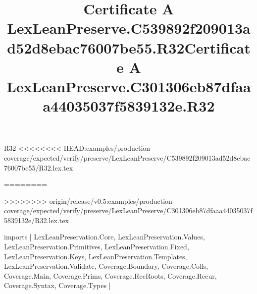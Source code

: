 \begin{lexlean}{R32}
<<<<<<<< HEAD:examples/production-coverage/expected/verify/preserve/LexLeanPreserve/C539892f209013ad52d8ebac76007be55/R32.lex.tex
\title{Certificate A LexLeanPreserve.C539892f209013ad52d8ebac76007be55.R32}
========
\title{Certificate A LexLeanPreserve.C301306eb87dfaaa44035037f5839132e.R32}
>>>>>>>> origin/release/v0.5:examples/production-coverage/expected/verify/preserve/LexLeanPreserve/C301306eb87dfaaa44035037f5839132e/R32.lex.tex
\begin{coremodule}
imports [
  LexLeanPreservation.Core,
  LexLeanPreservation.Values,
  LexLeanPreservation.Primitives,
  LexLeanPreservation.Fixed,
  LexLeanPreservation.Keys,
  LexLeanPreservation.Templates,
  LexLeanPreservation.Validate,
  Coverage.Boundary,
  Coverage.Colls,
  Coverage.Main,
  Coverage.Prims,
  Coverage.RecRoots,
  Coverage.Recur,
  Coverage.Syntax,
  Coverage.Types
]


\end{coremodule}
\end{lexlean}
